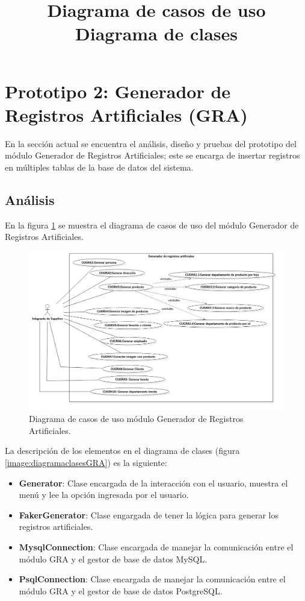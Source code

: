 \section{Prototipo 2: Generador de Registros Artificiales (GRA)}
En la sección actual se encuentra el análisis, diseño y pruebas del prototipo del módulo Generador de Registros Artificiales; este se encarga de insertar registros en múltiples tablas de la base de datos del sistema.\\

\subsection{Análisis}


\title{\textbf{Diagrama de casos de uso}\\}
En la figura \ref{image:casosusoGRA} se muestra el diagrama de casos de uso del módulo Generador de Registros Artificiales.

\FloatBarrier
\begin{figure}[htbp!]
		\centering
			\includegraphics[width=.9 \textwidth]{imagenes/CU/generadorRegistros}
		\caption{Diagrama de casos de uso módulo Generador de Registros Artificiales.}
		\label{image:casosusoGRA}
\end{figure}
\FloatBarrier


\title{\textbf{Diagrama de clases}\\}
La descripción de los elementos en el diagrama de clases (figura \ref{image:diagramaclasesGRA}) es la siguiente: 

\begin{itemize}
\item \textbf{Generator}: Clase encargada de la interacción con el usuario, muestra el menú y lee la opción ingresada por el usuario.
\item \textbf{FakerGenerator}: Clase engargada de tener la lógica para generar los registros artificiales.
\item \textbf{MysqlConnection}: Clase encargada de manejar la comunicación entre el módulo GRA y el gestor de base de datos MySQL.
\item \textbf{PsqlConnection}: Clase encargada de manejar la comunicación entre el módulo GRA y el gestor de base de datos PostgreSQL.
\end{itemize}

